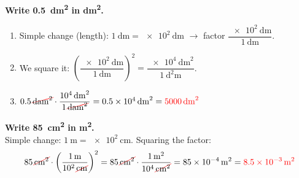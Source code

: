 \begin{example}
    \textbf{Write \qty{0.5}{\square\deca\metre} in \unit{\square\dm}.}
    \begin{enumerate}[label=\numberballmDarkTeal]
        \item Simple change (length): \(\qty{1}{\deca\m} = \qty{e2}{\dm}\) \(\to\) factor \(\dfrac{\qty{e2}{\dm}}{\qty{1}{\deca\m}}\).
        \item We square it: \(\left(\dfrac{\qty{e2}{\dm}}{\qty{1}{\deca\m}}\right)^{2} = \dfrac{\qty{e4}{\square\dm}}{\qty{1}{\square\deca\m}}\).
        \item \(
            \num{0.5}\,\cancelunit{\square\deca\m} \cdot \dfrac{\qty{e4}{\square\dm}}{1\,\cancelunit{\square\deca\m}} = \qty{0.5e4}{\square\dm} = \textcolor{red}{\qty{5000}{\square\dm}}
        \)
    \end{enumerate}
\end{example}

\begin{example}
    \textbf{Write \qty{85}{\square\cm} in \unit{\square\m}.} \\
    Simple change: \(\qty{1}{\m} = \qty{e2}{\cm}\). Squaring the factor:
    \begin{equation*}
        \num{85}\,\cancelunit{\square\cm} \cdot \left(\dfrac{\qty{1}{\m}}{\num{e2}\,\cancelunit{\cm}}\right)^{2}
        = \num{85}\,\cancelunit{\square\cm} \cdot \dfrac{\qty{1}{\square\m}}{\num{e4}\,\cancelunit{\square\cm}}
        = \qty{85e-4}{\square\m} = \textcolor{red}{\qty{8.5e-3}{\square\m}}
    \end{equation*}
\end{example}

